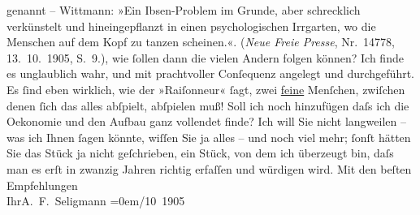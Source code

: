 \begin{ledgroupsized}[t]{13cm}
{{{                  genannt – Wittmann: »Ein Ibsen-Problem im Grunde, aber schrecklich
                     verkünstelt und hineingepflanzt in einen psychologischen Irrgarten, wo die
                     Menschen auf dem Kopf zu tanzen scheinen.«. (\emph{Neue Freie Presse}, Nr. 14778,
                        13. 10. 1905, S. 9.)}}}\label{K_L01563_1h}, wie ſollen dann die vielen
               Andern folgen können? Ich finde es unglaublich wahr, und mit prachtvoller Conſequenz
               angelegt und durchgeführt. Es ſind eben wirklich, wie der »Raiſonneur« ſagt, zwei
                  \uline{feine} Menſchen, zwiſchen denen ſich das alles
               abſpielt, abſpielen muß! Soll ich noch hinzufügen daſs ich die Oekonomie und den
               Aufbau ganz vollendet finde? Ich will Sie nicht langweilen – was ich Ihnen ſagen
               könnte, wiſſen Sie {\pb}ja alles – und noch viel mehr; ſonſt hätten Sie das
                  Stück ja nicht geſchrieben,
               ein Stück, von dem ich
               überzeugt bin, daſs man es erſt in zwanzig Jahren richtig erfaſſen und würdigen
               wird.\pend
           \pstart
           Mit den beſten Empfehlungen{\\[\baselineskip]}Ihr\spacefill\mbox{A. F. Seligmann}\pend
           \leftskip=0em{}/10 1905\pend
           
         
         \endnumbering{}\end{ledgroupsized}  \newcommand{\dateiname}{L01563}\newcommand{\titel}{Adalbert Seligmann an Arthur Schnitzler, 13. 10. 1905}\newcommand{\editorInnen}{Martin Anton Müller und Gerd-Hermann Susen}
      